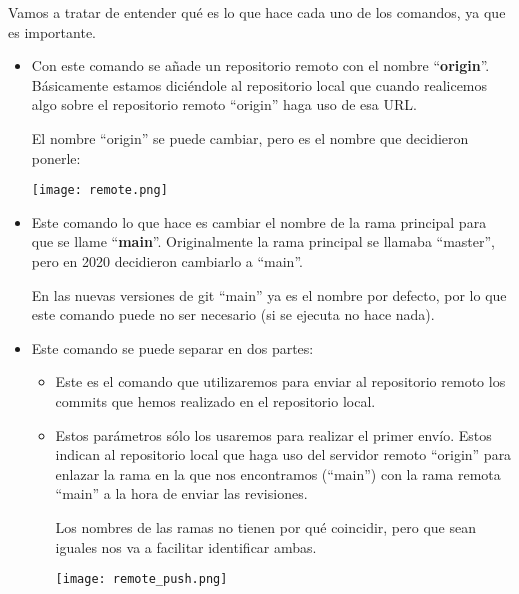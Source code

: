 Vamos a tratar de entender qué es lo que hace cada uno de los comandos, ya que es importante.

\begin{itemize}
    \item {}

    Con este comando se añade un repositorio remoto con el nombre “\textbf{origin}”. Básicamente estamos diciéndole al repositorio local que cuando realicemos algo sobre el repositorio remoto “origin” haga uso de esa URL.

    El nombre “origin” se puede cambiar, pero es el nombre que decidieron ponerle:

    \begin{center}
        \texttt{[image: remote.png]}
    \end{center}

    \item {}

    Este comando lo que hace es cambiar el nombre de la rama principal para que se llame “\textbf{main}”. Originalmente la rama principal se llamaba “master”, pero en 2020 decidieron cambiarlo a “main”.

    En las nuevas versiones de git “main” ya es el nombre por defecto, por lo que este comando puede no ser necesario (si se ejecuta no hace nada).

    \item {}

    Este comando se puede separar en dos partes:
    \begin{itemize}
        \item {}

        Este es el comando que utilizaremos para enviar al repositorio remoto los commits que hemos realizado en el repositorio local.

        \item {}

        Estos parámetros sólo los usaremos para realizar el primer envío. Estos indican al repositorio local que haga uso del servidor remoto “origin” para enlazar la rama en la que nos encontramos (“main”) con la rama remota “main” a la hora de enviar las revisiones.

        Los nombres de las ramas no tienen por qué coincidir, pero que sean iguales nos va a facilitar identificar ambas.

        \begin{center}
            \texttt{[image: remote\_push.png]}
        \end{center}
    \end{itemize}

\end{itemize}

